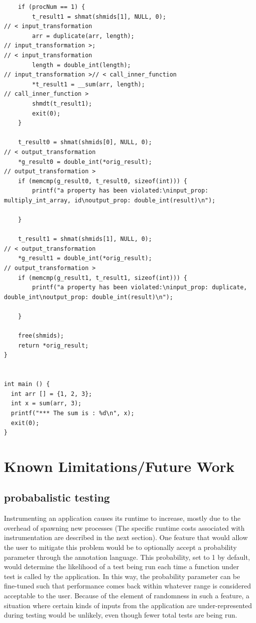 \documentclass[notitlepage]{article}
\begin{document}
\begin{verbatim}
    if (procNum == 1) {
        t_result1 = shmat(shmids[1], NULL, 0);
// < input_transformation
        arr = duplicate(arr, length);
// input_transformation >;
// < input_transformation
        length = double_int(length);
// input_transformation >// < call_inner_function
        *t_result1 = __sum(arr, length);
// call_inner_function >
        shmdt(t_result1);
        exit(0);
    }

    t_result0 = shmat(shmids[0], NULL, 0);
// < output_transformation
    *g_result0 = double_int(*orig_result);
// output_transformation >
    if (memcmp(g_result0, t_result0, sizeof(int))) {
        printf("a property has been violated:\ninput_prop: multiply_int_array, id\noutput_prop: double_int(result)\n");

    }

    t_result1 = shmat(shmids[1], NULL, 0);
// < output_transformation
    *g_result1 = double_int(*orig_result);
// output_transformation >
    if (memcmp(g_result1, t_result1, sizeof(int))) {
        printf("a property has been violated:\ninput_prop: duplicate, double_int\noutput_prop: double_int(result)\n");

    }

    free(shmids);
    return *orig_result;
}


int main () {
  int arr [] = {1, 2, 3};
  int x = sum(arr, 3);
  printf("*** The sum is : %d\n", x);
  exit(0);
}
\end{verbatim}

\section{Known Limitations/Future Work}

\subsection{probabalistic testing}

Instrumenting an application causes its runtime to increase, mostly due to the overhead of spawning new processes (The specific runtime costs associated with instrumentation are described in the next section). One feature that would allow the user to mitigate this problem would be to optionally accept a probability parameter through the annotation language. This probability, set to 1 by default, would determine the likelihood of a test being run each time a function under test is called by the application. In this way, the probability parameter can be fine-tuned such that performance comes back within whatever range is considered acceptable to the user. Because of the element of randomness in such a feature, a situation where certain kinds of inputs from the application are under-represented during testing would be unlikely, even though fewer total tests are being run.
\end{document}
